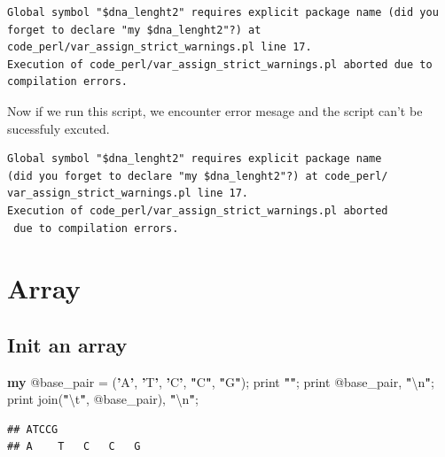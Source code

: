 \documentclass[]{book}
\makeatletter
\newenvironment{Shaded}{\begin{snugshade}}{\end{snugshade}}
\newcommand{\CharTok}[1]{\textcolor[rgb]{0.31,0.60,0.02}{#1}}
\newcommand{\DataTypeTok}[1]{\textcolor[rgb]{0.13,0.29,0.53}{#1}}
\newcommand{\FunctionTok}[1]{\textcolor[rgb]{0.00,0.00,0.00}{#1}}
\newcommand{\KeywordTok}[1]{\textcolor[rgb]{0.13,0.29,0.53}{\textbf{#1}}}
\newcommand{\NormalTok}[1]{#1}
\newcommand{\StringTok}[1]{\textcolor[rgb]{0.31,0.60,0.02}{#1}}
\newenvironment{kframe}{%
\medskip{}
\setlength{\fboxsep}{.8em}
 \def\at@end@of@kframe{}%
 \ifinner\ifhmode%
  \def\at@end@of@kframe{\end{minipage}}%
  \begin{minipage}{\columnwidth}%
 \fi\fi%
 \def\FrameCommand##1{\hskip\@totalleftmargin \hskip-\fboxsep
 \colorbox{shadecolor}{##1}\hskip-\fboxsep
     \hskip-\linewidth \hskip-\@totalleftmargin \hskip\columnwidth}%
 \MakeFramed {\advance\hsize-\width
   \@totalleftmargin\z@ \linewidth\hsize
   \@setminipage}}%
 {\par\unskip\endMakeFramed%
 \at@end@of@kframe}
\renewenvironment{Shaded}{\begin{kframe}}{\end{kframe}}
\makeatother
\begin{document}
\begin{verbatim}
Global symbol "$dna_lenght2" requires explicit package name (did you forget to declare "my $dna_lenght2"?) at code_perl/var_assign_strict_warnings.pl line 17.
Execution of code_perl/var_assign_strict_warnings.pl aborted due to compilation errors.
\end{verbatim}

Now if we run this script, we encounter error mesage and the script can't be sucessfuly excuted.

\begin{verbatim}
Global symbol "$dna_lenght2" requires explicit package name 
(did you forget to declare "my $dna_lenght2"?) at code_perl/
var_assign_strict_warnings.pl line 17.
Execution of code_perl/var_assign_strict_warnings.pl aborted
 due to compilation errors.
\end{verbatim}

\hypertarget{array}{%
\section{Array}\label{array}}

\hypertarget{init-an-array}{%
\subsection{Init an array}\label{init-an-array}}

\begin{Shaded}
\begin{Highlighting}[]
\KeywordTok{my} \DataTypeTok{@base_pair}\NormalTok{ = (}\KeywordTok{'}\StringTok{A}\KeywordTok{'}\NormalTok{, }\KeywordTok{'}\StringTok{T}\KeywordTok{'}\NormalTok{, }\KeywordTok{'}\StringTok{C}\KeywordTok{'}\NormalTok{, }\KeywordTok{"}\StringTok{C}\KeywordTok{"}\NormalTok{, }\KeywordTok{"}\StringTok{G}\KeywordTok{"}\NormalTok{);}
\FunctionTok{print} \KeywordTok{""}\NormalTok{;}
\FunctionTok{print} \DataTypeTok{@base_pair}\NormalTok{, }\KeywordTok{"}\CharTok{\textbackslash{}n}\KeywordTok{"}\NormalTok{;}
\FunctionTok{print} \FunctionTok{join}\NormalTok{(}\KeywordTok{"}\CharTok{\textbackslash{}t}\KeywordTok{"}\NormalTok{, }\DataTypeTok{@base_pair}\NormalTok{), }\KeywordTok{"}\CharTok{\textbackslash{}n}\KeywordTok{"}\NormalTok{;}
\end{Highlighting}
\end{Shaded}

\begin{verbatim}
## ATCCG
## A    T   C   C   G
\end{verbatim}
\end{document}
